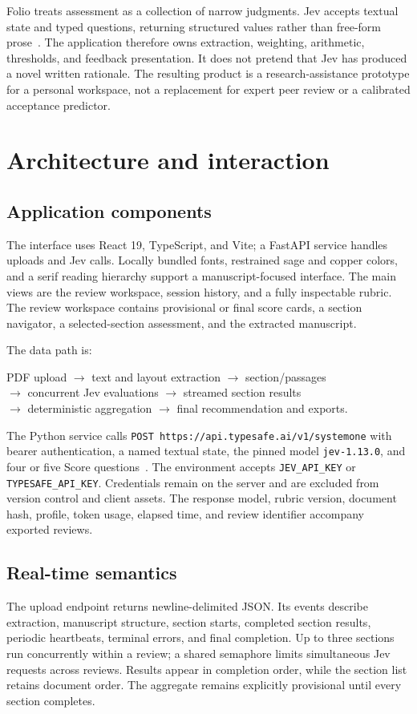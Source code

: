 \documentclass[11pt]{article}
\newcommand{\code}[1]{\texttt{#1}}
\begin{document}
Folio treats assessment as a collection of narrow judgments. Jev accepts textual state and typed questions, returning structured values rather than free-form prose~\cite{introduction}. The application therefore owns extraction, weighting, arithmetic, thresholds, and feedback presentation. It does not pretend that Jev has produced a novel written rationale. The resulting product is a research-assistance prototype for a personal workspace, not a replacement for expert peer review or a calibrated acceptance predictor.

\section{Architecture and interaction}
\subsection{Application components}
The interface uses React 19, TypeScript, and Vite; a FastAPI service handles uploads and Jev calls. Locally bundled fonts, restrained sage and copper colors, and a serif reading hierarchy support a manuscript-focused interface. The main views are the review workspace, session history, and a fully inspectable rubric. The review workspace contains provisional or final score cards, a section navigator, a selected-section assessment, and the extracted manuscript.

The data path is:
\begin{center}
\small
PDF upload $\rightarrow$ text and layout extraction $\rightarrow$ section/passages\\
$\rightarrow$ concurrent Jev evaluations $\rightarrow$ streamed section results\\
$\rightarrow$ deterministic aggregation $\rightarrow$ final recommendation and exports.
\end{center}

The Python service calls \code{POST https://api.typesafe.ai/v1/systemone} with bearer authentication, a named textual state, the pinned model \code{jev-1.13.0}, and four or five Score questions~\cite{api}. The environment accepts \code{JEV\_API\_KEY} or \code{TYPESAFE\_API\_KEY}. Credentials remain on the server and are excluded from version control and client assets. The response model, rubric version, document hash, profile, token usage, elapsed time, and review identifier accompany exported reviews.

\subsection{Real-time semantics}
The upload endpoint returns newline-delimited JSON. Its events describe extraction, manuscript structure, section starts, completed section results, periodic heartbeats, terminal errors, and final completion. Up to three sections run concurrently within a review; a shared semaphore limits simultaneous Jev requests across reviews. Results appear in completion order, while the section list retains document order. The aggregate remains explicitly provisional until every section completes.
\end{document}
